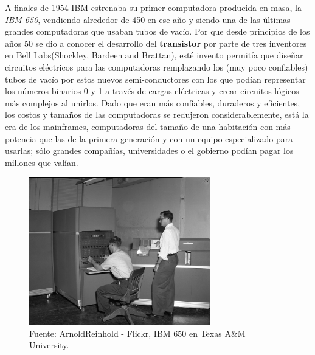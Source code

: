 \documentclass[letterpaper,12pt,oneside]{book}
\begin{document}
		A finales de 1954 IBM estrenaba su primer computadora producida en masa, la \textit{IBM 650}, vendiendo alrededor de 450 en ese año y siendo una
		de las últimas grandes computadoras que usaban tubos de vacío. Por que desde principios de los años 50 se dio a conocer el desarrollo del \textbf{transistor}
		por parte de tres inventores en Bell Labs(Shockley, Bardeen and Brattan), esté invento permitía que diseñar circuitos eléctricos para las
		computadoras remplazando los (muy poco confiables) tubos de vacío por estos nuevos semi-conductores con los que podían representar los números binarios
		0 y 1 a través de cargas eléctricas y crear circuitos lógicos más complejos al unirlos. Dado que eran más confiables, duraderos y eficientes, los costos
		y tamaños de las computadoras se redujeron considerablemente, está la era de los mainframes, computadoras del tamaño
		de una habitación con más potencia que las de la primera generación y con un equipo especializado para usarlas; sólo grandes compañías, universidades o
		el gobierno podían pagar los millones que valían\cite{oregan_brief_2012,tanenbaum_modern_2002}.
		
		\begin{figure}
		    \centering
		    \includegraphics[width=0.7\textwidth]{media/Historia/Wikipedia_IBM_650_at_Texas_A&M.jpeg}
		    \caption{Fuente: ArnoldReinhold - Flickr, IBM 650 en Texas A\&M University.} %
	    	\label{fig:ibm650}
		\end{figure}

		
\end{document}
